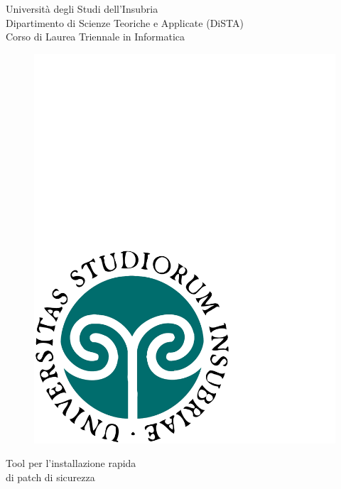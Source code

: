 \begin{titlepage}
  \begin{center}
    \begin{large}
      {\fontsize{20}{18}\selectfont\vspace*{0.50cm}Universit\`a degli Studi dell'Insubria}\\
      Dipartimento di Scienze Teoriche e Applicate (DiSTA)\\
      Corso di Laurea Triennale in Informatica
    \end{large}

    \vspace{1cm}
    \begin{figure}[h]
      \begin{center}
        \includegraphics[scale=0.25]{copertina/logounivector.pdf}
      \end{center}
    \end{figure}

      {
        \fontsize{26}{26}\selectfont\par\vspace*{0.75cm}
        Tool per l'installazione rapida\\
        \vspace{.15em}di patch di sicurezza
      }
    \par


\end{center}
\end{titlepage}
